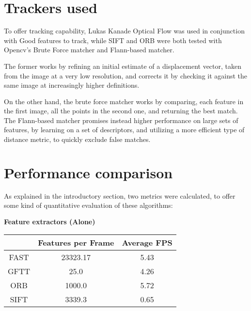 \documentclass[conference]{IEEEtran}
\begin{document}

\section{Trackers used} 

To offer tracking capability, Lukas Kanade Optical Flow was used in conjunction with Good features to track, 
while SIFT and ORB were both tested with Opencv's Brute Force matcher and Flann-based matcher.

The former works by refining an initial estimate of a displacement vector, taken from the image at a very low resolution, 
and corrects it by checking it against the same image at increasingly higher definitions.

On the other hand, the brute force matcher works by comparing, each feature in the first image, 
all the points in the second one, and returning the best match.
The Flann-based matcher promises instead higher performance  on large sets of features, 
by learning on a set of descriptors, and utilizing a more efficient type of distance metric, 
to quickly exclude false matches.


\section{Performance comparison}

As explained in the introductory section, two metrics were calculated, to offer some kind 
of quantitative evaluation of these algorithms:  

\begin{center}
    \textbf{Feature extractors (Alone)}\\
\end{center}

\begin{center}
    \begin{tabular}{||c c c||} 
     \hline
     & Features per Frame & Average FPS \\ [0.5ex] 
     \hline\hline
     FAST & 23323.17 & 5.43 \\ 
     \hline
     GFTT & 25.0 & 4.26 \\
     \hline
     ORB & 1000.0 & 5.72 \\
     \hline
     SIFT & 3339.3 & 0.65 \\
     \hline
    \end{tabular}
\end{center}
\end{document}

